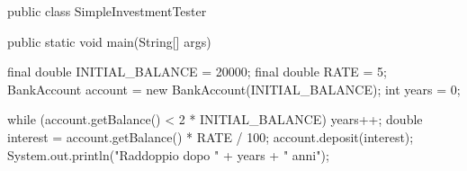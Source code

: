 \begin{unipdcode}[language=Java]
public class SimpleInvestmentTester {
    public static void main(String[] args) {
        final double INITIAL_BALANCE = 20000;
        final double RATE = 5;
        BankAccount account = new BankAccount(INITIAL_BALANCE);
        int years = 0;

        while (account.getBalance() < 2 * INITIAL_BALANCE) {
            years++;
            double interest = account.getBalance() * RATE / 100;
            account.deposit(interest);
        }
        System.out.println("Raddoppio dopo " + years + " anni");
    }
}
\end{unipdcode}
